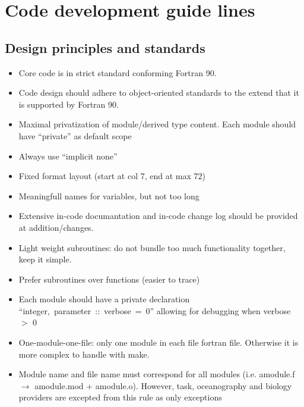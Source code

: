 
\chapter{Code development guide lines}

\section{Design principles and standards}

\begin{itemize}
  \item Core code is in strict standard conforming Fortran 90.
  \item Code design should adhere to object-oriented standards
        to the extend that it is supported by Fortran 90.
  \item Maximal privatization of module/derived type content.
        Each module should have ``private'' as default scope 
  \item Always use ``implicit none''
  \item Fixed format layout (start at col 7, end at max 72)
  \item Meaningfull names for variables, but not too long
  \item Extensive in-code documantation and in-code change log
        should be provided at addition/changes.
  \item Light weight subroutines: do not bundle too much functionality
        together, keep it simple. 
  \item Prefer subroutines over functions (easier to trace) 
  \item Each module should have a private declaration 
        \hbox{``integer, parameter :: verbose = 0''}
        allowing for debugging when verbose $>$ 0
  \item One-module-one-file: only one module in each file fortran file.
        Otherwise it is more complex to handle with make.
  \item Module name and file name must correspond for all
        modules (i.e. amodule.f $\rightarrow$ amodule.mod + amodule.o).
        However, task, oceanography and biology providers are 
        excepted from this rule as only exceptions
\end{itemize}


